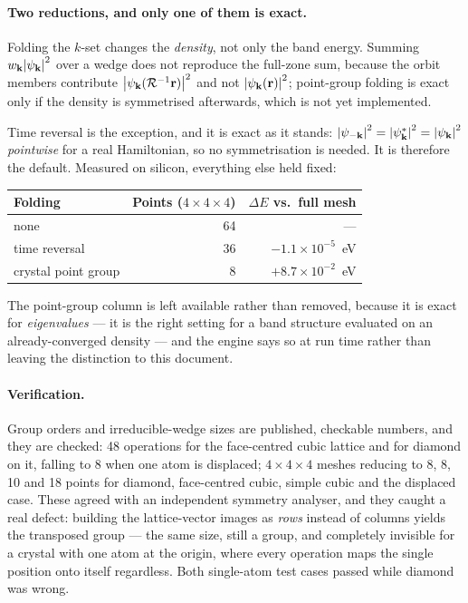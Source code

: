 \documentclass[11pt,a4paper]{article}
\begin{document}
\paragraph{Two reductions, and only one of them is exact.}
Folding the $k$-set changes the \emph{density}, not only the band energy.
Summing $w_{\vb{k}}\abs{\psi_{\vb{k}}}^2$ over a wedge does not reproduce the
full-zone sum, because the orbit members contribute
$\abs{\psi_{\vb{k}}(\mathcal{R}^{-1}\vb{r})}^2$ and not
$\abs{\psi_{\vb{k}}(\vb{r})}^2$; point-group folding is exact only if the
density is symmetrised afterwards, which is not yet implemented.

Time reversal is the exception, and it is exact as it stands:
$\abs{\psi_{-\vb{k}}}^2 = \abs{\psi_{\vb{k}}^{*}}^2 =
\abs{\psi_{\vb{k}}}^2$ \emph{pointwise} for a real Hamiltonian, so no
symmetrisation is needed. It is therefore the default. Measured on silicon,
everything else held fixed:

\begin{center}
\small
\begin{tabular}{@{}lrr@{}}
\toprule
Folding & Points ($4\times4\times4$) & $\Delta E$ vs.\ full mesh \\
\midrule
none                      & 64 & --- \\
time reversal             & 36 & $-1.1\times10^{-5}$~eV \\
crystal point group       &  8 & $+8.7\times10^{-2}$~eV \\
\bottomrule
\end{tabular}
\end{center}

\noindent
The point-group column is left available rather than removed, because it is
exact for \emph{eigenvalues} --- it is the right setting for a band structure
evaluated on an already-converged density --- and the engine says so at run
time rather than leaving the distinction to this document.

\paragraph{Verification.} Group orders and irreducible-wedge sizes are
published, checkable numbers, and they are checked: 48 operations for the
face-centred cubic lattice and for diamond on it, falling to 8 when one atom
is displaced; $4\times4\times4$ meshes reducing to 8, 8, 10 and 18 points for
diamond, face-centred cubic, simple cubic and the displaced case. These agreed
with an independent symmetry analyser, and they caught a real defect: building
the lattice-vector images as \emph{rows} instead of columns yields the
transposed group --- the same size, still a group, and completely invisible
for a crystal with one atom at the origin, where every operation maps the
single position onto itself regardless. Both single-atom test cases passed
while diamond was wrong.
\end{document}

